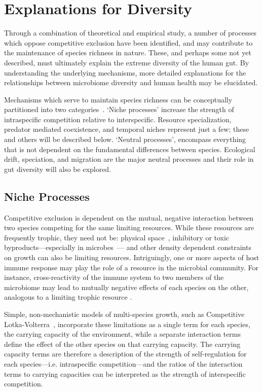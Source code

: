 \documentclass[12pt]{article}
\begin{document}
\section{Explanations for Diversity}
Through a combination of theoretical and empirical study, a number of
processes which oppose competitive exclusion have been identified,
and may contribute to the maintenance of species richness in nature.
These, and perhaps some not yet described,
must ultimately explain the extreme diversity of the human gut.
By understanding the underlying mechanisms,
more detailed explanations for the relationships between microbiome
diversity and human health may be elucidated.

Mechanisms which serve to maintain species richness can be conceptually
partitioned into two categories~\citep{Vellend2010}.
`Niche processes' increase the strength of intraspecific competition
relative to interspecific.
Resource specialization, predator mediated coexistence, and temporal niches
represent just a few;
these and others will be described below.
`Neutral processes', encompass everything that is not dependent on the
fundamental differences between species.
Ecological drift, speciation, and migration are the major neutral processes
and their role in gut diversity will also be explored.

\subsection{Niche Processes}
Competitive exclusion is dependent on the mutual, negative interaction
between two species competing for the same limiting resources.
While these resources are frequently trophic, they need not be:
physical space~\citep{Hastings1980,Paine1971},
inhibitory or toxic byproducts---especially in microbes~\citep{MacLean2008}---%
and other density dependent constraints on growth
can also be limiting resources.
Intriguingly, one or more aspects of host immune response may
play the role of a resource in the microbial community.
For instance, cross-reactivity of the immune system to two members
of the microbiome may lead to mutually negative effects of each
species on the other, analogous to a limiting trophic resource
\citep[For a review of the interaction of the microbiota with the immune
system, see][]{Brestoff2013}.

Simple, non-mechanistic models of multi-species growth,
such as Competitive Lotka-Volterra~\citep{Lotka1925,Volterra1928},
incorporate these limitations as a single term for each species,
the carrying capacity of the environment,
while a separate interaction terms define the effect of the other species
on that carrying capacity.
The carrying capacity terms are therefore a description of the strength
of self-regulation for each species---i.e\@. intraspecific competition---and
the ratios of the interaction terms to carrying capacities can
be interpreted as the strength of interspecific competition.
\end{document}
